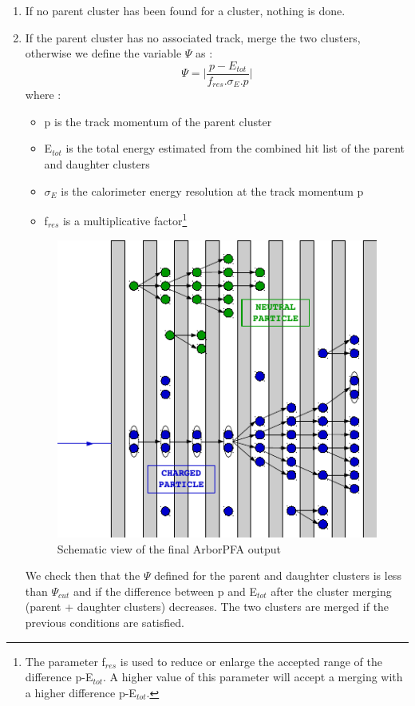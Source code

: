 \documentclass[cits]{JINST}
\begin{document}
\begin{enumerate}
  \item If no parent cluster has been found for a cluster, nothing is done.
  \item If the parent cluster has no associated track, merge the two clusters, otherwise we define the variable $\Psi$ as :
  \begin{equation}
    \label{PSI2_ALGORITHM_EQUATION}
    \Psi = \Big| \frac{p-E_{tot}}{f_{res} . \sigma_E . p} \Big|
  \end{equation}
  where :
  \begin{itemize}
    \item p is the track momentum of the parent cluster
    \item E$_{tot}$ is the total energy estimated from the combined hit list of the parent and daughter clusters
    \item $\sigma_E$ is the calorimeter energy resolution at the track momentum p
    \item f$_{res}$ is a multiplicative factor\footnote{The parameter f$_{res}$ is used to reduce or enlarge the accepted range of the difference p-E$_{tot}$. A higher value of this parameter will accept a merging with a higher difference p-E$_{tot}$.}
  \end{itemize}
  
\begin{figure}[!h]
  \begin{center}
    \includegraphics[width=0.4\linewidth]{PfoCreation.pdf}
  \end{center}
  \caption{\label{ARBOR_PFO_CREATION} Schematic view of the final ArborPFA output}
\end{figure}

We check then that the $\Psi$ defined for the parent and daughter clusters is less than $\Psi_{cut}$ and if the difference between p and E$_{tot}$ after the cluster merging (parent + daughter clusters) decreases. The two clusters are merged if the previous conditions are satisfied.

\end{enumerate}
\end{document}
